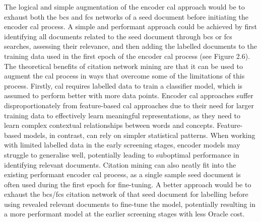 \documentclass[10pt,oneside]{book}
\begin{document}
The logical and simple augmentation of the encoder \gls*{cal} approach would be to exhaust both the \gls*{bcs} and \gls*{fcs} networks of a seed document before initiating the encoder \gls*{cal} process. A simple and performant approach could be achieved by first identifying all documents related to the seed document through \gls*{bcs} or \gls*{fcs} searches, assessing their relevance, and then adding the labelled documents to the training data used in the first epoch of the encoder \gls*{cal} process (see Figure 2.6). The theoretical benefits of citation network mining are that it can be used to augment the \gls*{cal} process in ways that overcome some of the limitations of this process. Firstly, \gls*{cal} requires labelled data to train a classifier model, which is assumed to perform better with more data points. Encoder \gls*{cal} approaches suffer disproportionately from feature-based \gls*{cal} approaches due to their need for larger training data to effectively learn meaningful representations, as they need to learn complex contextual relationships between words and concepts. Feature-based models, in contrast, can rely on simpler statistical patterns. When working with limited labelled data in the early screening stages, encoder models may struggle to generalise well, potentially leading to suboptimal performance in identifying relevant documents. Citation mining can also neatly fit into the existing performant encoder \gls*{cal} process, as a single sample seed document is often used during the first epoch for fine-tuning. A better approach would be to exhaust the \gls*{bcs}/\gls*{fcs} citation network of that seed document for labelling before using revealed relevant documents to fine-tune the model, potentially resulting in a more performant model at the earlier screening stages with less Oracle cost.
\end{document}
